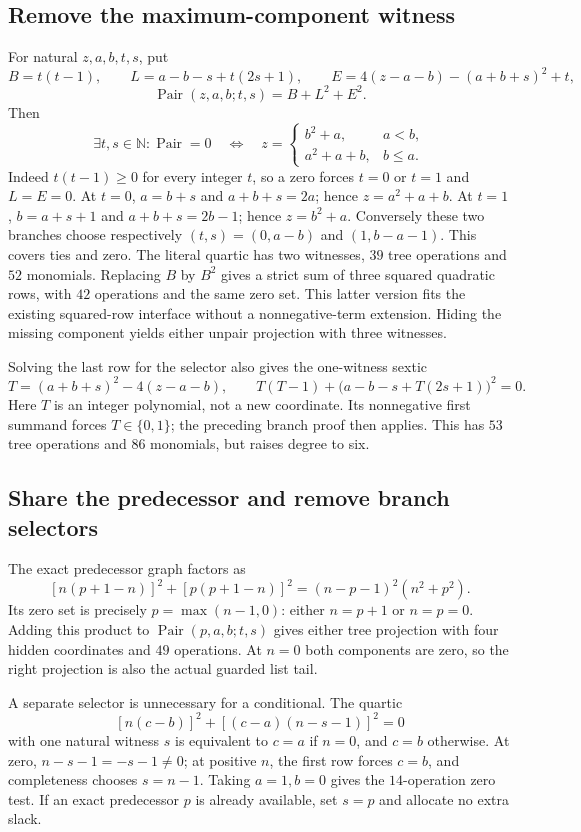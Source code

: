 \subsection{Remove the maximum-component witness}
For natural $z,a,b,t,s$, put
\[
 B=t(t-1),\qquad L=a-b-s+t(2s+1),\qquad
 E=4(z-a-b)-(a+b+s)^2+t,
\]
\[
 \operatorname{Pair}(z,a,b;t,s)=B+L^2+E^2.
\]
Then
\[
 \exists t,s\in\mathbb N:\operatorname{Pair}=0
 \quad\Longleftrightarrow\quad
 z=\begin{cases}b^2+a,&a<b,\\a^2+a+b,&b\le a.\end{cases}
\]
Indeed $t(t-1)\ge0$ for every integer $t$, so a zero forces $t=0$ or
$t=1$ and $L=E=0$.  At $t=0$, $a=b+s$ and $a+b+s=2a$; hence
$z=a^2+a+b$.  At $t=1$, $b=a+s+1$ and $a+b+s=2b-1$; hence
$z=b^2+a$.  Conversely these two branches choose respectively
$(t,s)=(0,a-b)$ and $(1,b-a-1)$.  This covers ties and zero.
The literal quartic has two witnesses, $39$ tree operations and $52$
monomials.  Replacing $B$ by $B^2$ gives a strict sum of three squared
quadratic rows, with $42$ operations and the same zero set.  This latter
version fits the existing squared-row interface without a nonnegative-term
extension.  Hiding the missing component yields either unpair projection
with three witnesses.

Solving the last row for the selector also gives the one-witness sextic
\[
 T=(a+b+s)^2-4(z-a-b),\qquad
 T(T-1)+\bigl(a-b-s+T(2s+1)\bigr)^2=0.
\]
Here $T$ is an integer polynomial, not a new coordinate.  Its nonnegative
first summand forces $T\in\{0,1\}$; the preceding branch proof then applies.
This has $53$ tree operations and $86$ monomials, but raises degree to six.

\subsection{Share the predecessor and remove branch selectors}
The exact predecessor graph factors as
\[
 [n(p+1-n)]^2+[p(p+1-n)]^2=(n-p-1)^2(n^2+p^2).
\]
Its zero set is precisely $p=\max(n-1,0)$: either $n=p+1$ or $n=p=0$.
Adding this product to $\operatorname{Pair}(p,a,b;t,s)$ gives either tree
projection with four hidden coordinates and $49$ operations.  At $n=0$
both components are zero, so the right projection is also the actual guarded
list tail.

A separate selector is unnecessary for a conditional.  The quartic
\[
 [n(c-b)]^2+[(c-a)(n-s-1)]^2=0
\]
with one natural witness $s$ is equivalent to $c=a$ if $n=0$, and $c=b$
otherwise.  At zero, $n-s-1=-s-1\ne0$; at positive $n$, the first row
forces $c=b$, and completeness chooses $s=n-1$.  Taking $a=1,b=0$ gives
the $14$-operation zero test.  If an exact predecessor $p$ is already
available, set $s=p$ and allocate no extra slack.

